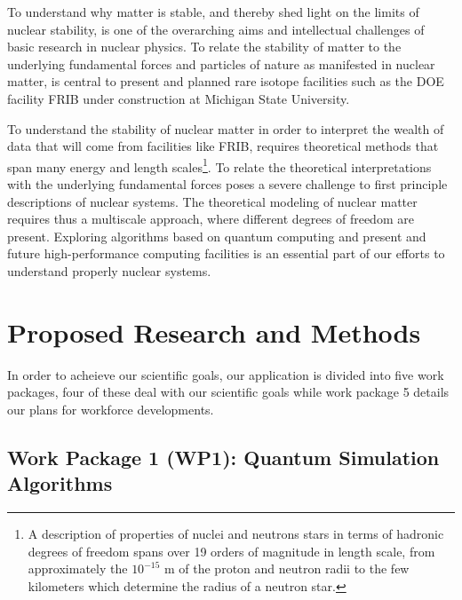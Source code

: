 \documentclass[10pt]{article}
\begin{document}
To understand why matter is stable, and thereby shed light on the
limits of nuclear stability, is one of the overarching aims and
intellectual challenges of basic research in nuclear physics. To
relate the stability of matter to the underlying fundamental forces
and particles of nature as manifested in nuclear matter, is central to
present and planned rare isotope facilities such as the DOE facility
FRIB under construction at Michigan State University.

To understand the stability of nuclear matter in order to interpret
the wealth of data that will come from facilities like FRIB, requires
theoretical methods that span many energy and length scales\footnote{A
  description of properties of nuclei and neutrons stars in terms of
  hadronic degrees of freedom spans over 19 orders of magnitude in
  length scale, from approximately the $10^{-15}$ m of the proton and
  neutron radii to the few kilometers which determine the radius of a
  neutron star.}. To relate the theoretical interpretations with the
underlying fundamental forces poses a severe challenge to first
principle descriptions of nuclear systems.  The theoretical modeling
of nuclear matter requires thus a multiscale approach, where different
degrees of freedom are present. Exploring algorithms based on quantum
computing and present and future high-performance computing facilities
is an essential part of our efforts to understand properly nuclear
systems.


\section{Proposed Research and Methods}

In order to acheieve our scientific goals, our application is divided into five work packages, four of these deal with our scientific goals while work package 5 details our plans for workforce developments. 


\subsection{Work Package 1 (WP1): Quantum Simulation Algorithms}
\end{document}
